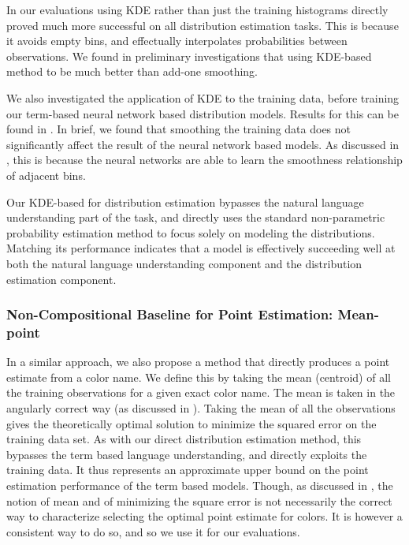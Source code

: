 In our evaluations using KDE rather than just the training histograms directly proved much more successful on all distribution estimation tasks.
This is because it avoids empty bins, and effectually interpolates probabilities between observations.
We found in preliminary investigations that using KDE-based method to be much better than add-one smoothing.

We also investigated the application of KDE to the training data,  before training our term-based neural network based distribution models.
Results for this can be found in .
In brief, we found that smoothing the training data does not significantly affect the result of the neural network based models.
As discussed in , this is because the neural networks are able to learn the smoothness relationship of adjacent bins.


Our KDE-based \empmodel{} for distribution estimation bypasses the natural language understanding part of the task,
and directly uses the standard non-parametric probability estimation method to focus solely on modeling the distributions.
Matching its performance indicates that a model is effectively succeeding well at both the natural language understanding component and the distribution estimation component.


\subsubsection{Non-Compositional Baseline for Point Estimation: Mean-point}
In a similar approach, we also propose a method that directly produces a point estimate from a color name.
We define this by taking the mean (centroid) of all the training observations for a given exact color name.
The mean is taken in the angularly correct way (as discussed in ).
Taking the mean of all the observations gives the theoretically optimal solution to minimize the squared error on the training data set.
As with our direct distribution estimation method, this bypasses the term based language understanding, and directly exploits the training data.
It thus represents an approximate upper bound on the point estimation performance of the term based models.
Though, as discussed in , the notion of mean and of minimizing the square error is not necessarily the correct way to characterize selecting the optimal point estimate for colors.
It is however a consistent way to do so, and so we use it for our evaluations.



